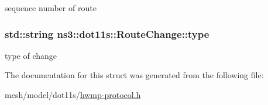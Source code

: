 sequence number of route 

\subsubsection[{\texorpdfstring{type}{type}}]{\setlength{\rightskip}{0pt plus 5cm}std\+::string ns3\+::dot11s\+::\+Route\+Change\+::type}\hypertarget{structns3_1_1dot11s_1_1RouteChange_acff05b54ffee794ebee006159bea20dc}{}\label{structns3_1_1dot11s_1_1RouteChange_acff05b54ffee794ebee006159bea20dc}


type of change 



The documentation for this struct was generated from the following file\+:\begin{DoxyCompactItemize}
\item 
mesh/model/dot11s/\hyperlink{hwmp-protocol_8h}{hwmp-\/protocol.\+h}\end{DoxyCompactItemize}
